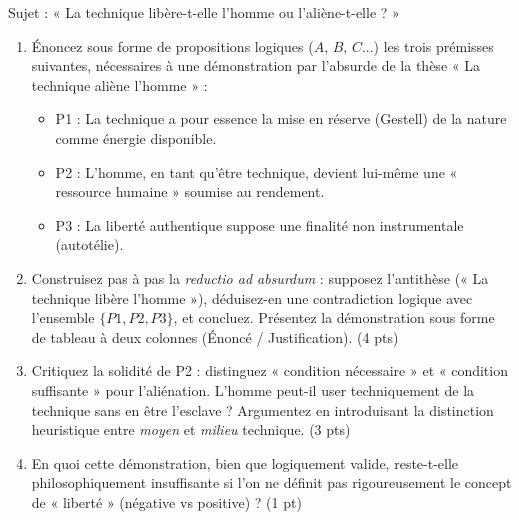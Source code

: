 \documentclass[11pt]{article}
\begin{document}
\begin{exercice}
Sujet : « La technique libère-t-elle l'homme ou l'aliène-t-elle ? »
\begin{enumerate}
    \item Énoncez sous forme de propositions logiques ($A$, $B$, $C$...) les trois prémisses suivantes, nécessaires à une démonstration par l'absurde de la thèse « La technique aliène l'homme » :
    \begin{itemize}
        \item P1 : La technique a pour essence la mise en réserve (Gestell) de la nature comme énergie disponible.
        \item P2 : L'homme, en tant qu'être technique, devient lui-même une « ressource humaine » soumise au rendement.
        \item P3 : La liberté authentique suppose une finalité non instrumentale (autotélie).
    \end{itemize}
    \item Construisez pas à pas la \textit{reductio ad absurdum} : supposez l'antithèse (« La technique libère l'homme »), déduisez-en une contradiction logique avec l'ensemble $\{P1, P2, P3\}$, et concluez. Présentez la démonstration sous forme de tableau à deux colonnes (Énoncé / Justification). \hfill (4 pts)
    \item Critiquez la solidité de P2 : distinguez « condition nécessaire » et « condition suffisante » pour l'aliénation. L'homme peut-il user techniquement de la technique sans en être l'esclave ? Argumentez en introduisant la distinction heuristique entre \textit{moyen} et \textit{milieu} technique. \hfill (3 pts)
    \item En quoi cette démonstration, bien que logiquement valide, reste-t-elle philosophiquement insuffisante si l'on ne définit pas rigoureusement le concept de « liberté » (négative vs positive) ? \hfill (1 pt)
\end{enumerate}
\end{exercice}
\end{document}
